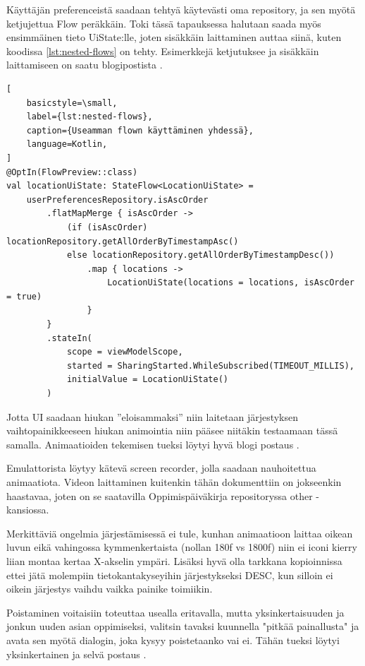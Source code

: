 Käyttäjän preferenceistä saadaan tehtyä käytevästi oma repository, ja sen myötä
ketjujettua Flow peräkkäin. Toki tässä tapauksessa halutaan saada myös
ensimmäinen tieto UiState:lle, joten sisäkkäin laittaminen auttaa siinä, kuten
koodissa \ref{lst:nested-flows} on tehty. Esimerkkejä ketjutuksee ja sisäkkäin
laittamiseen on saatu blogipostista \parencite{KotlinFlowNestingVSChaining}.

\begin{lstlisting}[
    basicstyle=\small,
    label={lst:nested-flows},
    caption={Useamman flown käyttäminen yhdessä},
    language=Kotlin,
]
@OptIn(FlowPreview::class)
val locationUiState: StateFlow<LocationUiState> =
    userPreferencesRepository.isAscOrder
        .flatMapMerge { isAscOrder ->
            (if (isAscOrder) locationRepository.getAllOrderByTimestampAsc()
            else locationRepository.getAllOrderByTimestampDesc())
                .map { locations ->
                    LocationUiState(locations = locations, isAscOrder = true)
                }
        }
        .stateIn(
            scope = viewModelScope,
            started = SharingStarted.WhileSubscribed(TIMEOUT_MILLIS),
            initialValue = LocationUiState()
        )
\end{lstlisting}

Jotta UI saadaan hiukan ''eloisammaksi'' niin laitetaan järjestyksen
vaihtopainikkeeseen hiukan animointia niin pääsee niitäkin testaamaan tässä
samalla. Animaatioiden tekemisen tueksi löytyi hyvä blogi postaus
\parencite{CardFlipAnimationWithJetpackCompose}.

Emulattorista löytyy kätevä screen recorder, jolla saadaan nauhoitettua
animaatiota. Videon laittaminen kuitenkin tähän dokumenttiin on jokseenkin
haastavaa, joten on se saatavilla Oppimispäiväkirja repositoryssa other
-kansiossa.

Merkittäviä ongelmia järjestämisessä ei tule, kunhan animaatioon laittaa oikean
luvun eikä vahingossa kymmenkertaista (nollan 180f vs 1800f) niin ei iconi
kierry liian montaa kertaa X-akselin ympäri. Lisäksi hyvä olla tarkkana
kopioinnissa ettei jätä molempiin tietokantakyseyihin järjestykseksi DESC, kun
silloin ei oikein järjestys vaihdu vaikka painike toimiikin.

Poistaminen voitaisiin toteuttaa usealla eritavalla, mutta yksinkertaisuuden ja
jonkun uuden asian oppimiseksi, valitsin tavaksi kuunnella "pitkää painallusta"
ja avata sen myötä dialogin, joka kysyy poistetaanko vai ei. Tähän tueksi
löytyi yksinkertainen ja selvä postaus \parencite{DevelopersMemoLongPress}.

